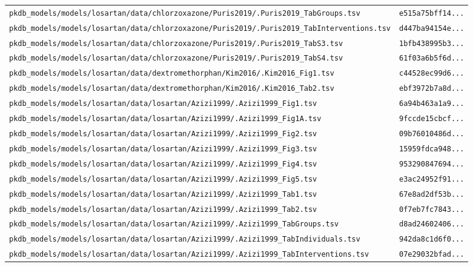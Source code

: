 \documentclass{article}
\begin{document}
\begin{longtable}{ll}
\texttt{pkdb\_models/models/losartan/data/chlorzoxazone/Puris2019/.Puris2019\_TabGroups.tsv} & \texttt{e515a75bff14...} \\
\texttt{pkdb\_models/models/losartan/data/chlorzoxazone/Puris2019/.Puris2019\_TabInterventions.tsv} & \texttt{d447ba94154e...} \\
\texttt{pkdb\_models/models/losartan/data/chlorzoxazone/Puris2019/.Puris2019\_TabS3.tsv} & \texttt{1bfb438995b3...} \\
\texttt{pkdb\_models/models/losartan/data/chlorzoxazone/Puris2019/.Puris2019\_TabS4.tsv} & \texttt{61f03a6b5f6d...} \\
\texttt{pkdb\_models/models/losartan/data/dextromethorphan/Kim2016/.Kim2016\_Fig1.tsv} & \texttt{c44528ec99d6...} \\
\texttt{pkdb\_models/models/losartan/data/dextromethorphan/Kim2016/.Kim2016\_Tab2.tsv} & \texttt{ebf3972b7a8d...} \\
\texttt{pkdb\_models/models/losartan/data/losartan/Azizi1999/.Azizi1999\_Fig1.tsv} & \texttt{6a94b463a1a9...} \\
\texttt{pkdb\_models/models/losartan/data/losartan/Azizi1999/.Azizi1999\_Fig1A.tsv} & \texttt{9fccde15cbcf...} \\
\texttt{pkdb\_models/models/losartan/data/losartan/Azizi1999/.Azizi1999\_Fig2.tsv} & \texttt{09b76010486d...} \\
\texttt{pkdb\_models/models/losartan/data/losartan/Azizi1999/.Azizi1999\_Fig3.tsv} & \texttt{15959fdca948...} \\
\texttt{pkdb\_models/models/losartan/data/losartan/Azizi1999/.Azizi1999\_Fig4.tsv} & \texttt{953290847694...} \\
\texttt{pkdb\_models/models/losartan/data/losartan/Azizi1999/.Azizi1999\_Fig5.tsv} & \texttt{e3ac24952f91...} \\
\texttt{pkdb\_models/models/losartan/data/losartan/Azizi1999/.Azizi1999\_Tab1.tsv} & \texttt{67e8ad2df53b...} \\
\texttt{pkdb\_models/models/losartan/data/losartan/Azizi1999/.Azizi1999\_Tab2.tsv} & \texttt{0f7eb7fc7843...} \\
\texttt{pkdb\_models/models/losartan/data/losartan/Azizi1999/.Azizi1999\_TabGroups.tsv} & \texttt{d8ad24602406...} \\
\texttt{pkdb\_models/models/losartan/data/losartan/Azizi1999/.Azizi1999\_TabIndividuals.tsv} & \texttt{942da8c1d6f0...} \\
\texttt{pkdb\_models/models/losartan/data/losartan/Azizi1999/.Azizi1999\_TabInterventions.tsv} & \texttt{07e29032bfad...} \\

\end{longtable}
\end{document}
